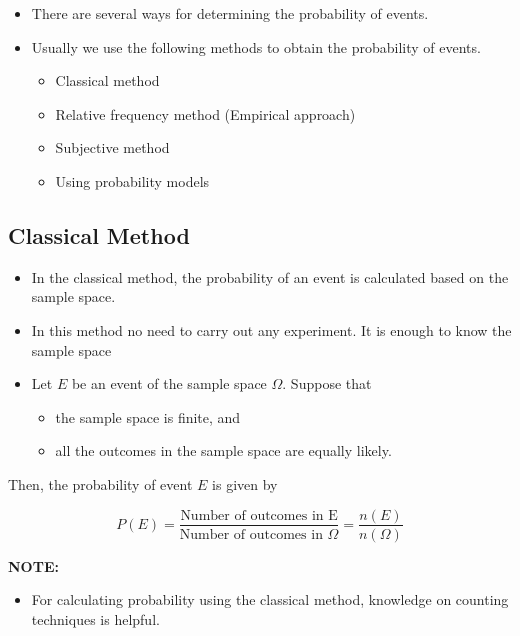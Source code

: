 \documentclass[]{book}
\providecommand{\tightlist}{%
  \setlength{\itemsep}{0pt}\setlength{\parskip}{0pt}}
\begin{document}
\begin{itemize}
\tightlist
\item
  There are several ways for determining the probability of events.
\item
  Usually we use the following methods to obtain the probability of events.

  \begin{itemize}
  \tightlist
  \item
    Classical method
  \item
    Relative frequency method (Empirical approach)
  \item
    Subjective method
  \item
    Using probability models
  \end{itemize}
\end{itemize}

\hypertarget{classical-method}{%
\subsection{Classical Method}\label{classical-method}}

\begin{itemize}
\tightlist
\item
  In the classical method, the probability of an event is calculated based on the sample space.
\item
  In this method no need to carry out any experiment. It is enough to know the sample space
\item
  Let \(E\) be an event of the sample space \(\Omega\). Suppose that

  \begin{itemize}
  \tightlist
  \item
    the sample space is finite, and
  \item
    all the outcomes in the sample space are equally likely.
  \end{itemize}
\end{itemize}

Then, the probability of event \(E\) is given by

\[ P(E) = \frac{\text{Number of outcomes in E}}{\text{Number of outcomes in } \Omega} = \frac{n(E)}{n(\Omega)}\]

\textbf{NOTE:}

\begin{itemize}
\tightlist
\item
  For calculating probability using the classical method, knowledge on counting techniques is helpful.
\end{itemize}
\end{document}
